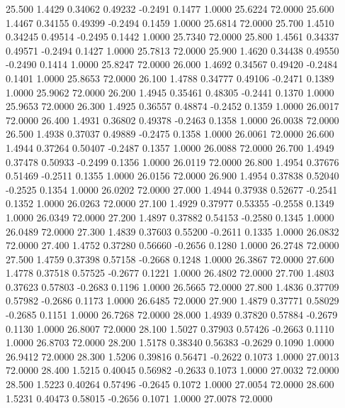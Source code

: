   25.500   1.4429   0.34062   0.49232  -0.2491   0.1477   1.0000  25.6224  72.0000
  25.600   1.4467   0.34155   0.49399  -0.2494   0.1459   1.0000  25.6814  72.0000
  25.700   1.4510   0.34245   0.49514  -0.2495   0.1442   1.0000  25.7340  72.0000
  25.800   1.4561   0.34337   0.49571  -0.2494   0.1427   1.0000  25.7813  72.0000
  25.900   1.4620   0.34438   0.49550  -0.2490   0.1414   1.0000  25.8247  72.0000
  26.000   1.4692   0.34567   0.49420  -0.2484   0.1401   1.0000  25.8653  72.0000
  26.100   1.4788   0.34777   0.49106  -0.2471   0.1389   1.0000  25.9062  72.0000
  26.200   1.4945   0.35461   0.48305  -0.2441   0.1370   1.0000  25.9653  72.0000
  26.300   1.4925   0.36557   0.48874  -0.2452   0.1359   1.0000  26.0017  72.0000
  26.400   1.4931   0.36802   0.49378  -0.2463   0.1358   1.0000  26.0038  72.0000
  26.500   1.4938   0.37037   0.49889  -0.2475   0.1358   1.0000  26.0061  72.0000
  26.600   1.4944   0.37264   0.50407  -0.2487   0.1357   1.0000  26.0088  72.0000
  26.700   1.4949   0.37478   0.50933  -0.2499   0.1356   1.0000  26.0119  72.0000
  26.800   1.4954   0.37676   0.51469  -0.2511   0.1355   1.0000  26.0156  72.0000
  26.900   1.4954   0.37838   0.52040  -0.2525   0.1354   1.0000  26.0202  72.0000
  27.000   1.4944   0.37938   0.52677  -0.2541   0.1352   1.0000  26.0263  72.0000
  27.100   1.4929   0.37977   0.53355  -0.2558   0.1349   1.0000  26.0349  72.0000
  27.200   1.4897   0.37882   0.54153  -0.2580   0.1345   1.0000  26.0489  72.0000
  27.300   1.4839   0.37603   0.55200  -0.2611   0.1335   1.0000  26.0832  72.0000
  27.400   1.4752   0.37280   0.56660  -0.2656   0.1280   1.0000  26.2748  72.0000
  27.500   1.4759   0.37398   0.57158  -0.2668   0.1248   1.0000  26.3867  72.0000
  27.600   1.4778   0.37518   0.57525  -0.2677   0.1221   1.0000  26.4802  72.0000
  27.700   1.4803   0.37623   0.57803  -0.2683   0.1196   1.0000  26.5665  72.0000
  27.800   1.4836   0.37709   0.57982  -0.2686   0.1173   1.0000  26.6485  72.0000
  27.900   1.4879   0.37771   0.58029  -0.2685   0.1151   1.0000  26.7268  72.0000
  28.000   1.4939   0.37820   0.57884  -0.2679   0.1130   1.0000  26.8007  72.0000
  28.100   1.5027   0.37903   0.57426  -0.2663   0.1110   1.0000  26.8703  72.0000
  28.200   1.5178   0.38340   0.56383  -0.2629   0.1090   1.0000  26.9412  72.0000
  28.300   1.5206   0.39816   0.56471  -0.2622   0.1073   1.0000  27.0013  72.0000
  28.400   1.5215   0.40045   0.56982  -0.2633   0.1073   1.0000  27.0032  72.0000
  28.500   1.5223   0.40264   0.57496  -0.2645   0.1072   1.0000  27.0054  72.0000
  28.600   1.5231   0.40473   0.58015  -0.2656   0.1071   1.0000  27.0078  72.0000
